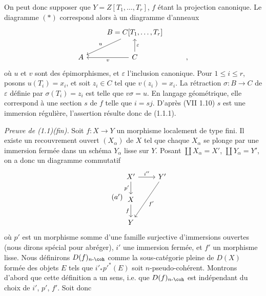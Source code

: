 On
peut donc supposer que \(Y=Z[T_1,\ldots,T_r]\), \(f\) étant la projection canonique. Le diagramme \((*)\) correspond alors à un diagramme d'anneaux
\[
\begin{tikzcd}
& B=C[T_1,\ldots,T_r] \arrow[dl,"u"'] & \\
A & C \arrow[l,"v"] \arrow[u,"\varepsilon"'] & {,}
\end{tikzcd}
\]
où \(u\) et \(v\) sont des épimorphismes, et \(\varepsilon\) l'inclusion canonique. Pour \(1\leq i\leq r\), posons \(u(T_i)=x_i\), et soit \(z_i\in C\) tel que \(v(z_i)=x_i\). La rétraction \(\sigma:B\longrightarrow C\) de \(\varepsilon\) définie par \(\sigma(T_i)=z_i\) est telle que \(v\sigma=u\). En langage géométrique, elle correspond à une section \(s\) de \(f\) telle que \(i=sj\). D'après (VII 1.10) \(s\) est une immersion régulière, l'assertion résulte donc de (1.1.1).

\emph{Preuve de (1.1)(fin).} Soit \(f:X\to Y\) un morphisme localement de type fini. Il existe un recouvrement ouvert \((X_\alpha)\) de \(X\) tel que chaque \(X_\alpha\) se plonge par une immersion fermée dans un schéma \(Y_\alpha\) lisse sur \(Y\). Posant \(\coprod X_\alpha=X'\), \(\coprod Y_\alpha=Y'\), on a donc un diagramme commutatif
\begin{equation}\tag{$a'$}
\begin{tikzcd}
X' \arrow[r,"i''"] \arrow[d,"p'"'] & Y' \arrow[ddl,"f'"]\\
X \arrow[d,"f"']\\
Y
\end{tikzcd}
\end{equation}
où \(p'\) est un morphisme somme d'une famille surjective d'immersions ouvertes (nous dirons spécial pour abréger), \(i'\) une immersion fermée, et \(f'\) un morphisme lisse. Nous définirons \(D(f)_{n\text{-}\coh}\) comme la sous-catégorie pleine de \(D(X)\) formée des objets \(E\) tels que \(i'_*p'^*(E)\) soit \(n\)-pseudo-cohérent. Montrons d'abord que cette définition a un sens, i.e. que \(D(f)_{n\text{-}\coh}\) est indépendant du choix de \(i'\), \(p'\), \(f'\). Soit donc
